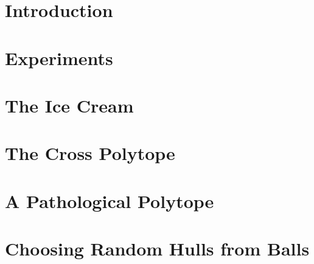 \documentclass{report}
\begin{document}
%

\newpage

\tableofcontents

\chapter{Introduction}



\chapter{Experiments}



\appendix
\chapter{The Ice Cream} \label{app_ice_cream}



\chapter{The Cross Polytope} \label{app_cross_polytope}



\chapter{A Pathological Polytope} \label{app_cyclic_polytope}



\chapter{Choosing Random Hulls from Balls} \label{app_balls}





\end{document}
